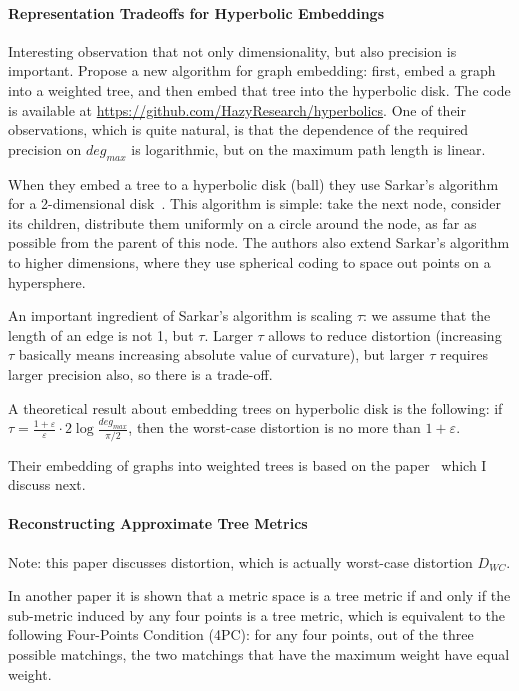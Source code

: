 \documentclass{article}
\begin{document}
\paragraph{Representation Tradeoffs for Hyperbolic Embeddings~\cite{sala2018representation}}

Interesting observation that not only dimensionality, but also precision is important.
Propose a new algorithm for graph embedding: first, embed a graph into a weighted tree, and then embed that tree into the hyperbolic disk. The code is available at \url{https://github.com/HazyResearch/hyperbolics}.
One of their observations, which is quite natural, is that the dependence of the required precision on $deg_{max}$ is logarithmic, but on the maximum path length is linear.

When they embed a tree to a hyperbolic disk (ball) they use Sarkar's algorithm for a 2-dimensional disk~\cite{sarkar2011low}. This algorithm is simple: take the next node, consider its children, distribute them uniformly on a circle around the node, as far as possible from the parent of this node. The authors also extend Sarkar's algorithm to higher dimensions, where they use spherical coding to space out points on a hypersphere. 

An important ingredient of Sarkar's algorithm is scaling $\tau$: we assume that the length of an edge is not 1, but $\tau$. Larger $\tau$ allows to reduce distortion (increasing $\tau$ basically means increasing absolute value of curvature), but larger $\tau$ requires larger precision also, so there is a trade-off. 

A theoretical result about embedding trees on hyperbolic disk is the following: if $\tau = \frac{1+\varepsilon}{\varepsilon} \cdot 2 \log \frac{deg_{max}}{\pi/2}$, then the worst-case
distortion is no more than $1 + \varepsilon$.

Their embedding of graphs into weighted trees is based on the paper~\cite{abraham2007reconstructing} which I discuss next.

\paragraph{Reconstructing Approximate Tree Metrics~\cite{abraham2007reconstructing}}

Note: this paper discusses distortion, which is actually worst-case distortion $D_{WC}$.

In another paper it is shown that a metric space is a tree metric if and only if the sub-metric induced by any four points is a tree metric, which is equivalent to the following Four-Points Condition (4PC): for any four points, out of the three possible matchings, the two matchings that have the maximum weight have equal weight.
\end{document}
